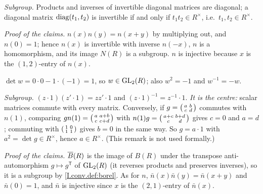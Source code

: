 \begin{definition}
\end{definition}
\noindent\emph{Subgroup.} Products and inverses of invertible diagonal matrices are diagonal; a diagonal matrix
$\operatorname{diag}(t_1,t_2)$ is invertible if and only if $t_1t_2\in R^\times$, i.e.\ $t_1,t_2\in R^\times$.

\begin{definition}
\end{definition}
\noindent\emph{Proof of the claims.} $n(x)n(y)=n(x+y)$ by multiplying out, and $n(0)=1$; hence $n(x)$ is invertible
with inverse $n(-x)$, $n$ is a homomorphism, and its image $N(R)$ is a subgroup. $n$ is injective because $x$ is the
$(1,2)$-entry of $n(x)$.

\begin{definition}
\end{definition}
\noindent $\det w=0\cdot0-1\cdot(-1)=1$, so $w\in\mathrm{GL}_2(R)$; also $w^2=-1$ and $w^{-1}=-w$.

\begin{definition}
\end{definition}
\noindent\emph{Subgroup.} $(z\cdot1)(z'\cdot1)=zz'\cdot1$ and $(z\cdot1)^{-1}=z^{-1}\cdot1$. \emph{It is the centre:}
scalar matrices commute with every matrix. Conversely, if $g=\begin{psmallmatrix}a&b\\c&d\end{psmallmatrix}$ commutes
with $n(1)$, comparing $gn(1)=\begin{psmallmatrix}a&a+b\\c&c+d\end{psmallmatrix}$ with
$n(1)g=\begin{psmallmatrix}a+c&b+d\\c&d\end{psmallmatrix}$ gives $c=0$ and $a=d$; commuting with $\begin{psmallmatrix}1&0\\1&1\end{psmallmatrix}$ gives
$b=0$ in the same way. So $g=a\cdot1$ with $a^2=\det g\in R^\times$, hence $a\in R^\times$. (This remark is not used
formally.)

\begin{definition}
\end{definition}
\noindent\emph{Proof of the claims.} $\overline{B}(R)$ is the image of $B(R)$ under the transpose anti-automorphism $g\mapsto g^{\mathsf T}$ of
$\mathrm{GL}_2(R)$ (it reverses products and preserves inverses), so it is a subgroup by \cref{I.conv.def:borel}. As for
$n$, $\bar n(x)\bar n(y)=\bar n(x+y)$ and $\bar n(0)=1$, and $\bar n$ is injective since $x$ is the $(2,1)$-entry
of $\bar n(x)$.

